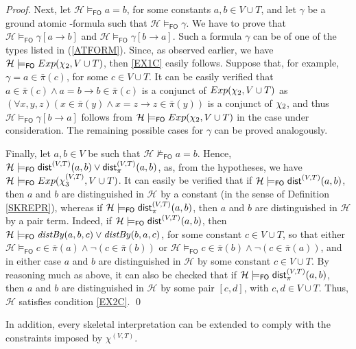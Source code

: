 \documentclass[a4paper]{llncs}
\newcommand{\HExp}{Exp}
\newcommand{\pair}[2]{[#1,#2]}
\newcommand{\nonpairin}[2]{#1 \in \bar{\pi}(#2)}
\newcommand{\seteq}[2]{#1=#2}
\newcommand{\consta}{a}
\newcommand{\constb}{b}
\newcommand{\constc}{c}
\newcommand{\subst}[3]{#1[#2\rightarrow#3]}
\newcommand{\hinter}{\ensuremath{\mathcal{H}}}
\newcommand{\fomodels}[2]{#1 \models_{\mathsf{FO}} #2}
\newcommand{\notfomodels}[2]{#1 \not\models_{\mathsf{FO}} #2}
\begin{document}
\begin{proof}
Next, let $\fomodels{\hinter}{\seteq{\consta}{\constb}}$, for some
constants
$\consta, \constb \in V \cup T$, and let $\gamma$ be a ground
atomic \Forallpizero-formula such that $\fomodels{\hinter}{\gamma}$. We have to prove
that $\fomodels{\hinter}{\subst{\gamma}{\consta}{\constb}}$ and
$\fomodels{\hinter}{\subst{\gamma}{\constb}{\consta}}$. Such a formula $\gamma$
can be of one of the types listed in (\ref{ATFORM}). 
Since, as observed earlier, we have 
$\fomodels{\hinter}{\HExp(\exonef, V \cup T)}$, then \ref{EX1C} easily 
follows. Suppose that, for example, $\gamma=\nonpairin{\consta}{\constc}$, 
for some $\constc \in V \cup T$. It can be easily verified that
$\nonpairin{\consta}{\constc} \wedge \seteq{\consta}{\constb} \rightarrow
\nonpairin{\constb}{\constc}$  is a conjunct of $\HExp(\exonef, V \cup T)$
as $(\forall x, y, z)(\nonpairin{x}{y} \wedge \seteq{x}{z} 
\rightarrow \nonpairin{z}{y})$ is a conjunct of $\chi_2$,
and thus $\fomodels{\hinter}{\subst{\gamma}{\constb}{\consta}}$
follows from $\fomodels{\hinter}{\HExp(\exonef, V \cup T)}$ in the case
under consideration. The
remaining possible cases for $\gamma$ can be proved analogously.

Finally, let $\consta, \constb \in V$ be such that 
$\notfomodels{\hinter}{\seteq{\consta}{\constb}}$. Hence,
$\fomodels{\hinter}{\distS^{(V,T)}(\consta,\constb) \vee 
\distPS^{(V,T)}(\consta,\constb)}$, as, from the hypotheses, we have
$\fomodels{\hinter}{\HExp(\extwof, V \cup T)}$. It can easily be 
verified that if 
$\fomodels{\hinter}{\distS^{(V,T)}(\consta,\constb)}$,
then $\consta$ and $\constb$ are distinguished in $\hinter$ by a 
constant (in the sense of Definition \ref{SKREPR}), whereas if
$\fomodels{\hinter}{\distPS^{(V,T)}(\consta,\constb)}$, then 
$\consta$ and $\constb$ are distinguished in $\hinter$ by a pair term.
Indeed, if $\fomodels{\hinter}{\distS^{(V,T)}(\consta,\constb)}$, 
then $\fomodels{\hinter}{\distby{\consta}{\constb}{\constc} \vee
\distby{\constb}{\consta}{\constc}}$, for some constant $\constc \in 
V \cup T$, so that either 
$\fomodels{\hinter}{\nonpairin{\constc}{\consta} \wedge 
\neg(\nonpairin{\constc}{\constb})}$
or $\fomodels{\hinter}{\nonpairin{\constc}{\constb} 
\wedge\neg(\nonpairin{\constc}{\consta})}$, and in either case 
$\consta$ and
$\constb$ are distinguished in $\hinter$ by some constant $\constc 
\in V \cup T$. By reasoning much as
above, it can also be checked that if 
$\fomodels{\hinter}{\distPS^{(V,T)}(\consta,\constb)}$, then 
$\consta$ and $\constb$ are
distinguished in $\hinter$ by some pair $\pair{\constc}{d}$, with 
$\constc, d \in V \cup T$.
Thus, $\hinter$ satisfies condition \ref{EX2C}. \qed
\end{proof}
%
In addition, every skeletal interpretation can be extended to
comply with the constraints imposed by $\chi^{(V,T)}$.
\end{document}
